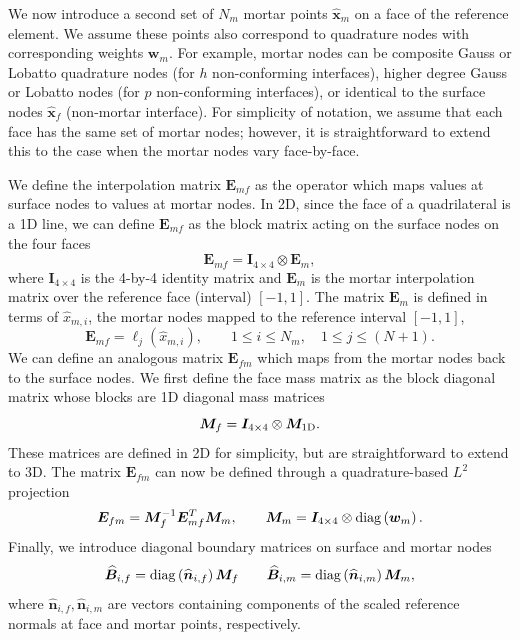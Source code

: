 \documentclass{svjour3}                     %
\renewcommand{\hat}{\widehat}
\newcommand{\diag}[1]{{\rm diag}\LRp{#1}}
\newcommand{\LRp}[1]{\left( #1 \right)}
\begin{document}
We now introduce a second set of $N_m$ mortar points $\hat{\bm{x}}_m$ on a face of the reference element.  We assume these points also correspond to quadrature nodes with corresponding weights $\bm{w}_m$.  For example, mortar nodes can be composite Gauss or Lobatto quadrature nodes (for $h$ non-conforming interfaces), higher degree Gauss or Lobatto nodes (for $p$ non-conforming interfaces), or identical to the surface nodes $\hat{\bm{x}}_f$ (non-mortar interface).   For simplicity of notation, we assume that each face has the same set of mortar nodes; however, it is straightforward to extend this to the case when the mortar nodes vary face-by-face.  

We define the interpolation matrix $\bm{E}_{mf}$ as the operator which maps values at surface nodes to values at mortar nodes.  In 2D, since the face of a quadrilateral is a 1D line, we can define $\bm{E}_{mf}$ as the block matrix acting on the surface nodes on the four faces 
\[
\bm{E}_{mf} = \bm{I}_{4\times 4}\otimes \bm{E}_m,
\]
where $\bm{I}_{4\times 4}$ is the 4-by-4 identity matrix and $\bm{E}_m$ is the mortar interpolation matrix over the reference face (interval) $[-1,1]$.  The matrix $\bm{E}_m$ is defined in terms of $\hat{x}_{m,i}$, the mortar nodes mapped to the reference interval $[-1,1]$,   
\[
\bm{E}_{mf} = \ell_j(\hat{x}_{m,i}), \qquad 1\leq i \leq N_m, \quad 1\leq j \leq (N+1).
\]
We can define an analogous matrix $\bm{E}_{fm}$ which maps from the mortar nodes back to the surface nodes.  We first define the face mass matrix as the block diagonal matrix whose blocks are 1D diagonal mass matrices
\[
\bm{M}_f = \bm{I}_{4\times 4} \otimes \bm{M}_{\rm 1D}.
\]
These matrices are defined in 2D for simplicity, but are straightforward to extend to 3D.  
The matrix $\bm{E}_{fm}$ can now be defined through a quadrature-based $L^2$ projection 
\[
\bm{E}_{fm} = \bm{M}_f^{-1}\bm{E}_{mf}^T\bm{M}_m, \qquad \bm{M}_m = \bm{I}_{4\times 4}\otimes \diag{\bm{w}_m}.
\]
Finally, we introduce diagonal boundary matrices on surface and mortar nodes 
\begin{equation}
\hat{\bm{B}}_{i,f} = \diag{\hat{\bm{n}}_{i,f}}\bm{M}_f %
\qquad \hat{\bm{B}}_{i,m} = \diag{\hat{\bm{n}}_{i,m}}\bm{M}_m,%
\label{eq:Bi}
\end{equation}
where $\hat{\bm{n}}_{i,f}, \hat{\bm{n}}_{i,m}$ are vectors containing components of the scaled reference normals at face and mortar points, respectively.  
\end{document}
